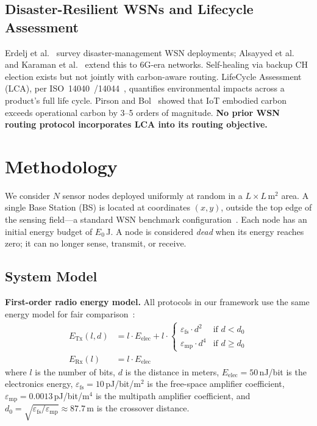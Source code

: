 \documentclass[12pt, onecolumn, journal]{IEEEtran}
\begin{document}
\subsection{Disaster-Resilient WSNs and Lifecycle Assessment}
Erdelj et al.~\cite{erdelj2017disaster} survey disaster-management WSN deployments; Alsayyed et al.~\cite{alsayyed2025disaster} and Karaman et al.~\cite{karaman2025disaster_survey} extend this to 6G-era networks.
Self-healing via backup CH election exists but not jointly with carbon-aware routing.
LifeCycle Assessment (LCA), per ISO~14040~\cite{iso14040}/14044~\cite{iso14044}, quantifies environmental impacts across a product's full life cycle.
Pirson and Bol~\cite{pirson2021embodied} showed that IoT embodied carbon exceeds operational carbon by 3--5 orders of magnitude.
\textbf{No prior WSN routing protocol incorporates LCA into its routing objective.}



\section{Methodology}
\label{sec:methodology}

We consider $N$ sensor nodes deployed uniformly at random in a $L \times L$\,m$^2$ area.
A single Base Station (BS) is located at coordinates $(x, y)$, outside the top edge of the sensing field---a standard WSN benchmark configuration~\cite{heinzelman2002leach}.
Each node has an initial energy budget of $E_0$\,J.
A node is considered \emph{dead} when its energy reaches zero; it can no longer sense, transmit, or receive.

\subsection{System Model}
\label{sec:system_model}

\textbf{First-order radio energy model.}
All protocols in our framework use the same energy model for fair comparison~\cite{heinzelman2000leach, rappaport2002wireless}:
\begin{align}
    E_{\text{Tx}}(l, d) &= l \cdot E_{\text{elec}} + l \cdot
    \begin{cases}
        \varepsilon_{\text{fs}} \cdot d^2 & \text{if } d < d_0 \\
        \varepsilon_{\text{mp}} \cdot d^4 & \text{if } d \geq d_0
    \end{cases}
    \label{eq:etx} \\
    E_{\text{Rx}}(l) &= l \cdot E_{\text{elec}}
    \label{eq:erx}
\end{align}
where $l$ is the number of bits, $d$ is the distance in meters, $E_{\text{elec}} = 50$\,nJ/bit is the electronics energy, $\varepsilon_{\text{fs}} = 10$\,pJ/bit/m$^2$ is the free-space amplifier coefficient, $\varepsilon_{\text{mp}} = 0.0013$\,pJ/bit/m$^4$ is the multipath amplifier coefficient, and $d_0 = \sqrt{\varepsilon_{\text{fs}}/\varepsilon_{\text{mp}}} \approx 87.7$\,m is the crossover distance.
\end{document}

